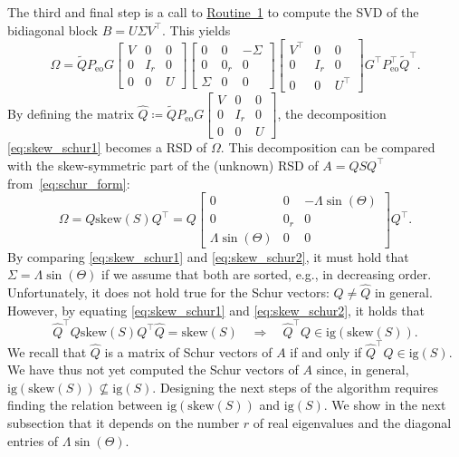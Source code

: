 \documentclass[10pt,twoside,dvipsnames]{siamart1116}
\numberwithin{algorithm}{section}
\numberwithin{equation}{section}
\newcommand{\wordref}[2]{\hyperlink{#1}{#2}}
\begin{document}
The third and final step is a call to \wordref{oracle1}{Routine~1} to compute the SVD of the bidiagonal block $B =U\Sigma V^\top $. This yields
\begin{equation}\label{eq:skew_schur1}
	\Omega = \widetilde{Q}P_{\mathrm{eo}}G\begin{bmatrix}
	V&0&0\\
	0&I_r&0\\
	0&0&U
	\end{bmatrix}\begin{bmatrix}
	0&0&-\Sigma\\
	0&0_r&0\\
	 \Sigma&0&0
	\end{bmatrix}\begin{bmatrix}
	V^\top &0&0\\
	0&I_r&0\\
	0&0&U^\top 
	\end{bmatrix}G^\top P_{\mathrm{eo}}^\top  \widetilde{Q}^\top .
\end{equation}
By defining the matrix $\widehat{Q}\coloneq\widetilde{Q}P_{\mathrm{eo}}G\left[\begin{smallmatrix}
	V&0&0\\
	0&I_r&0\\
	0&0&U
	\end{smallmatrix}\right]$, the decomposition \eqref{eq:skew_schur1} becomes a RSD of $\Omega$. This decomposition can be compared with the skew-symmetric part of the (unknown) RSD of $A=QSQ^\top $ from~\eqref{eq:schur_form}:
\begin{equation}\label{eq:skew_schur2}
		\Omega = Q \mathrm{skew}(S)Q^\top  = Q \begin{bmatrix}
	0&0&-\Lambda\sin(\Theta)\\
	0&0_r&0\\
	 \Lambda\sin(\Theta)&0&0
	\end{bmatrix}Q^\top .
	\end{equation}
By comparing \eqref{eq:skew_schur1} and \eqref{eq:skew_schur2}, it must hold that $\Sigma=\Lambda\sin(\Theta)$ if we assume that both are sorted, e.g., in decreasing order. Unfortunately, it does not hold true for the Schur vectors: $Q\neq\widehat{Q}$ in general. However, by equating \eqref{eq:skew_schur1} and \eqref{eq:skew_schur2},  it holds that 
  \begin{equation*}%
  	\widehat{Q}^\top Q\mathrm{skew}(S)Q^\top \widehat{Q} = \mathrm{skew}(S)\quad \Longrightarrow\quad \widehat{Q}^\top Q\in\mathrm{ig}(\mathrm{skew}(S)).
  \end{equation*}
We recall that $\widehat{Q}$ is a matrix of Schur vectors of $A$ if and only if $\widehat{Q}^\top Q\in\mathrm{ig}(S)$. We have thus not yet computed the Schur vectors of $A$ since, in general, $\mathrm{ig}(\mathrm{skew}(S))\nsubseteq \mathrm{ig}(S)$. Designing the next steps of the algorithm requires finding the relation between $\mathrm{ig}(\mathrm{skew}(S))$ and $\mathrm{ig}(S)$. We show in the next subsection that it depends on the number $r$ of real eigenvalues and the diagonal entries of $\Lambda\sin(\Theta)$.
\end{document}

